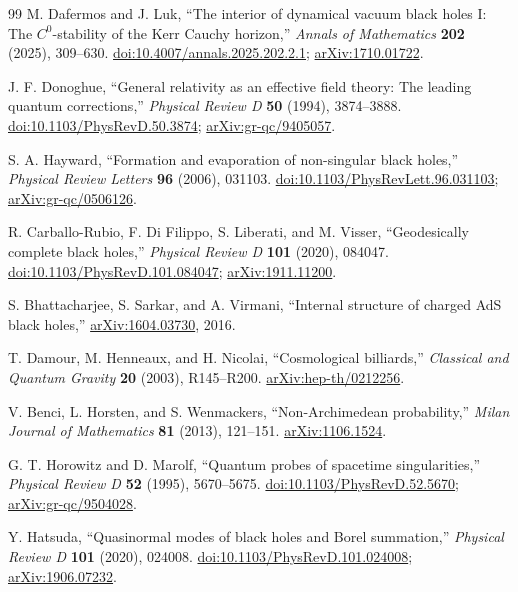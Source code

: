 \documentclass[11pt,letterpaper]{article}
\theoremstyle{definition}
\theoremstyle{remark}
\begin{document}
\begin{thebibliography}{99}
M. Dafermos and J. Luk,
``The interior of dynamical vacuum black holes I: The $C^0$-stability of the
Kerr Cauchy horizon,''
\emph{Annals of Mathematics} \textbf{202} (2025), 309--630.
\href{https://doi.org/10.4007/annals.2025.202.2.1}{doi:10.4007/annals.2025.202.2.1};
\href{https://arxiv.org/abs/1710.01722}{arXiv:1710.01722}.

J. F. Donoghue,
``General relativity as an effective field theory: The leading quantum corrections,''
\emph{Physical Review D} \textbf{50} (1994), 3874--3888.
\href{https://doi.org/10.1103/PhysRevD.50.3874}{doi:10.1103/PhysRevD.50.3874};
\href{https://arxiv.org/abs/gr-qc/9405057}{arXiv:gr-qc/9405057}.

S. A. Hayward, ``Formation and evaporation of non-singular black holes,''
\emph{Physical Review Letters} \textbf{96} (2006), 031103.
\href{https://doi.org/10.1103/PhysRevLett.96.031103}{doi:10.1103/PhysRevLett.96.031103};
\href{https://arxiv.org/abs/gr-qc/0506126}{arXiv:gr-qc/0506126}.

R. Carballo-Rubio, F. Di Filippo, S. Liberati, and M. Visser,
``Geodesically complete black holes,''
\emph{Physical Review D} \textbf{101} (2020), 084047.
\href{https://doi.org/10.1103/PhysRevD.101.084047}{doi:10.1103/PhysRevD.101.084047};
\href{https://arxiv.org/abs/1911.11200}{arXiv:1911.11200}.

S. Bhattacharjee, S. Sarkar, and A. Virmani,
``Internal structure of charged AdS black holes,''
\href{https://arxiv.org/abs/1604.03730}{arXiv:1604.03730}, 2016.

T. Damour, M. Henneaux, and H. Nicolai,
``Cosmological billiards,''
\emph{Classical and Quantum Gravity} \textbf{20} (2003), R145--R200.
\href{https://arxiv.org/abs/hep-th/0212256}{arXiv:hep-th/0212256}.

V. Benci, L. Horsten, and S. Wenmackers,
``Non-Archimedean probability,''
\emph{Milan Journal of Mathematics} \textbf{81} (2013), 121--151.
\href{https://arxiv.org/abs/1106.1524}{arXiv:1106.1524}.

G. T. Horowitz and D. Marolf,
``Quantum probes of spacetime singularities,''
\emph{Physical Review D} \textbf{52} (1995), 5670--5675.
\href{https://doi.org/10.1103/PhysRevD.52.5670}{doi:10.1103/PhysRevD.52.5670};
\href{https://arxiv.org/abs/gr-qc/9504028}{arXiv:gr-qc/9504028}.

Y. Hatsuda, ``Quasinormal modes of black holes and Borel summation,''
\emph{Physical Review D} \textbf{101} (2020), 024008.
\href{https://doi.org/10.1103/PhysRevD.101.024008}{doi:10.1103/PhysRevD.101.024008};
\href{https://arxiv.org/abs/1906.07232}{arXiv:1906.07232}.


\end{thebibliography}
\end{document}
